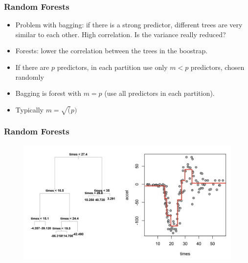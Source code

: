 \documentclass[
  shownotes,
  xcolor={svgnames},
  hyperref={colorlinks,citecolor=DarkBlue,linkcolor=DarkRed,urlcolor=DarkBlue}
  , aspectratio=169]{beamer}
\begin{document}
\begin{frame}[fragile]
\frametitle{Random Forests}

\begin{itemize}
\item Problem with bagging: if there is a strong predictor, different trees are very similar to each other. High correlation. Is the variance really reduced?
\bigskip
\item Forests: lower the correlation between the trees in the boostrap.
\bigskip
\item If there are $p$ predictors, in each partition use only $m <p$ predictors, chosen randomly
\bigskip
\item Bagging is forest with $m = p$ (use all predictors in each partition).
\bigskip
\item Typically $m = \sqrt(p)$
\end{itemize}

\end{frame}
\begin{frame}[fragile]
\frametitle{Random Forests}

\begin{figure}[H] \centering
            \captionsetup{justification=centering}
              \includegraphics[scale=0.25]{figures/accel_1}
 \end{figure}
\end{frame}
\end{document}
